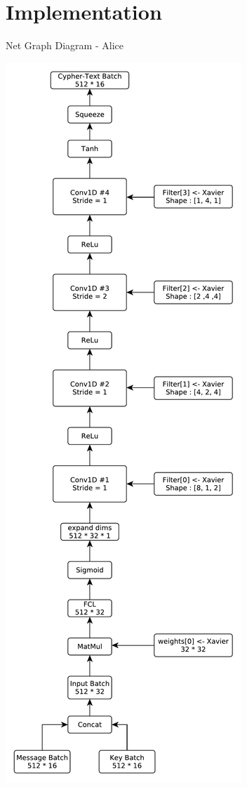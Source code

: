 \documentclass[a4paper, 12pt]{report}
\begin{document}
\chapter{Implementation}\label{sec:implementation}
\newpage
\begin{blockfigure}{ Net Graph Diagram - Alice}
	\begin{center}
		\includegraphics[height=0.93\textheight]{Alice-Diagram}
	\end{center}
\end{blockfigure}
\end{document}
